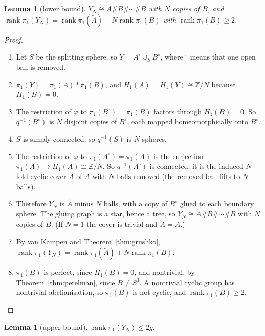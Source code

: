 \documentclass[11pt]{article}
\newtheorem{lemma}[theorem]{Lemma}
\theoremstyle{definition}
\newcommand{\Z}{\mathbb{Z}}
\newcommand{\rk}{\operatorname{rank}}
\begin{document}
\begin{lemma}[lower bound]\label{lem:lower}
$Y_N\cong\tilde A\#B\#\cdots\#B$ with $N$ copies of $B$, and $\rk\pi_1(Y_N)=\rk\pi_1(\tilde A)+N\rk\pi_1(B)$ with $\rk\pi_1(B)\ge2$.
\end{lemma}

\begin{proof}
\begin{enumerate}[leftmargin=*]
\item Let $S$ be the splitting sphere, so $Y=A^\circ\cup_S B^\circ$, where $^\circ$ means that one open ball is removed.
\item $\pi_1(Y)=\pi_1(A)*\pi_1(B)$, and $H_1(A)=H_1(Y)\cong\Z/N$ because $H_1(B)=0$.
\item The restriction of $\varphi$ to $\pi_1(B^\circ)=\pi_1(B)$ factors through $H_1(B)=0$. So $q^{-1}(B^\circ)$ is $N$ disjoint copies of $B^\circ$, each mapped homeomorphically onto $B^\circ$.
\item $S$ is simply connected, so $q^{-1}(S)$ is $N$ spheres.
\item The restriction of $\varphi$ to $\pi_1(A^\circ)=\pi_1(A)$ is the surjection $\pi_1(A)\to H_1(A)\cong\Z/N$. So $q^{-1}(A^\circ)$ is connected: it is the induced $N$-fold cyclic cover $\tilde A$ of $A$ with $N$ balls removed (the removed ball lifts to $N$ balls).
\item Therefore $Y_N$ is $\tilde A$ minus $N$ balls, with a copy of $B^\circ$ glued to each boundary sphere. The gluing graph is a star, hence a tree, so $Y_N\cong\tilde A\#B\#\cdots\#B$ with $N$ copies of $B$. (If $N=1$ the cover is trivial and $\tilde A=A$.)
\item By van Kampen and Theorem~\ref{thm:grushko}, $\rk\pi_1(Y_N)=\rk\pi_1(\tilde A)+N\rk\pi_1(B)$.
\item $\pi_1(B)$ is perfect, since $H_1(B)=0$, and nontrivial, by Theorem~\ref{thm:perelman}, since $B\ne S^3$. A nontrivial cyclic group has nontrivial abelianisation, so $\pi_1(B)$ is not cyclic, and $\rk\pi_1(B)\ge2$.\qedhere
\end{enumerate}
\end{proof}

\begin{lemma}[upper bound]\label{lem:upper}
$\rk\pi_1(Y_N)\le 2g$.
\end{lemma}
\end{document}
